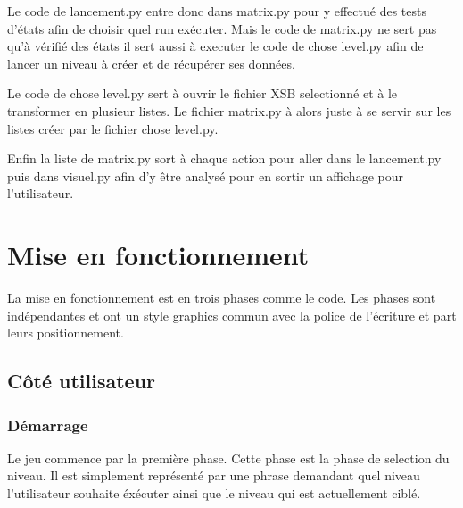 \documentclass[a4paper,12pt]{article} %
\begin{document}
Le code de lancement.py entre donc dans matrix.py pour y effectué des tests d'états afin de choisir quel run exécuter.
Mais le code de matrix.py ne sert pas qu'à vérifié des états il sert aussi à executer le code de chose level.py afin de lancer un niveau à créer et de récupérer ses données.

Le code de chose level.py sert à ouvrir le fichier XSB selectionné et à le transformer en plusieur listes.
Le fichier matrix.py à alors juste à se servir sur les listes créer par le fichier chose level.py.

Enfin la liste de matrix.py sort à chaque action pour aller dans le lancement.py puis dans visuel.py afin d'y être analysé pour en sortir un affichage pour l'utilisateur.

\newpage

\section{Mise en fonctionnement}

La mise en fonctionnement est en trois phases comme le code.
Les phases sont indépendantes et ont un style graphics commun avec la police de l'écriture et part leurs positionnement.

\subsection{Côté utilisateur}

\subsubsection{Démarrage}

Le jeu commence par la première phase.
Cette phase est la phase de selection du niveau.
Il est simplement représenté par une phrase demandant quel niveau l'utilisateur souhaite éxécuter ainsi que le niveau qui est actuellement ciblé.
\end{document}
